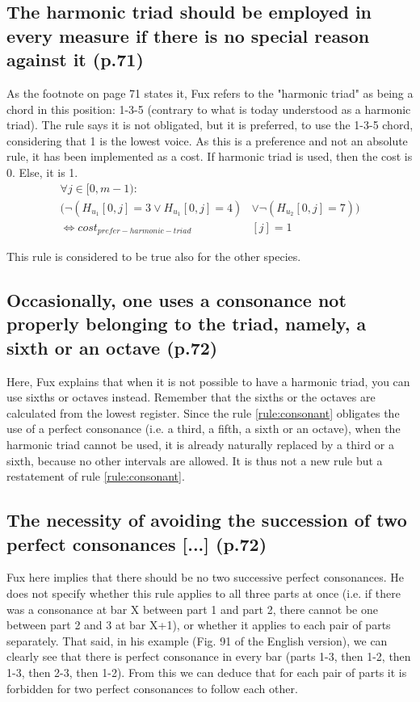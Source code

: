 \subsection {\reddot The harmonic triad should be employed in every measure if there is no special reason against it (p.71)}
As the footnote on page 71 states it, Fux refers to the "harmonic triad" as being a chord in this position: 1-3-5 (contrary to what is today understood as a harmonic triad).
The rule says it is not obligated, but it is preferred, to use the 1-3-5 chord, considering that 1 is the lowest voice. As this is a preference and not an absolute rule, it has been implemented as a cost. If harmonic triad is used, then the cost is 0. Else, it is 1.
\begin{equation}
\begin{aligned}
\forall j \in [0, m-1) \colon &\\
(\neg (H_{u_1}[0, j] = 3 \lor H_{u_1}[0, j] = 4) &\lor \neg (H_{u_2}[0, j] = 7)) \\
\iff cost_{prefer-harmonic-triad}&[j] = 1
\end{aligned}
\end{equation}

This rule is considered to be true also for the other species.

\subsection{\reddot Occasionally, one uses a consonance not properly belonging to the triad, namely, a sixth or an octave (p.72)}
Here, Fux explains that when it is not possible to have a harmonic triad, you can use sixths or octaves instead. Remember that the sixths or the octaves are calculated from the lowest register. Since the rule \ref{rule:consonant} obligates the use of a perfect consonance (i.e. a third, a fifth, a sixth or an octave), when the harmonic triad cannot be used, it is already naturally replaced by a third or a sixth, because no other intervals are allowed. It is thus not a new rule but a restatement of rule \ref{rule:consonant}.

\subsection{\reddot The necessity of avoiding  the succession of two perfect consonances [...] (p.72)} \label{rule:succ-p-cons}
Fux here implies that there should be no two successive perfect consonances. He does not specify whether this rule applies to all three parts at once (i.e. if there was a consonance at bar X between part 1 and part 2, there cannot be one between part 2 and 3 at bar X+1), or whether it applies to each pair of parts separately. That said, in his example (Fig. 91 of the English version), we can clearly see that there is perfect consonance in every bar (parts 1-3, then 1-2, then 1-3, then 2-3, then 1-2). From this we can deduce that for each pair of parts it is forbidden for two perfect consonances to follow each other.

